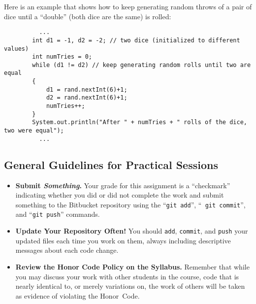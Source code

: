 \noindent Here is an example that shows how to keep generating random throws of a pair of dice
until a ``double'' (both dice are the same) is rolled:
\vspace{-0.2in}
\begin{verbatim}
          ...
        int d1 = -1, d2 = -2; // two dice (initialized to different values)
        int numTries = 0;
        while (d1 != d2) // keep generating random rolls until two are equal
        {
            d1 = rand.nextInt(6)+1;
            d2 = rand.nextInt(6)+1;
            numTries++;
        }
        System.out.println("After " + numTries + " rolls of the dice, two were equal");
          ...
\end{verbatim}

\vspace*{-.15in}
\subsection*{General Guidelines for Practical Sessions}
\vspace*{-.05in}
\begin{itemize}
\item {\bf Submit \textbf{\textit{Something}}.} Your grade for this assignment is a ``checkmark'' indicating whether you
  did or did not complete the work and submit something to the Bitbucket repository using the ``{\tt git add}'', ``{\tt
    git commit}'', and ``{\tt git push}'' commands.

\item {\bf Update Your Repository Often!} You should {\tt add}, {\tt commit}, and {\tt push} your updated files each
  time you work on them, always including descriptive messages about each code change.

\item {\bf Review the Honor Code Policy on the Syllabus.} Remember that while you may discuss your work with other
  students in the course, code that is nearly identical to, or merely variations on, the work of others will be
  taken as evidence of violating the \mbox{Honor Code}.

\end{itemize}


